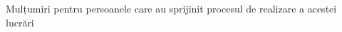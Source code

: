 \pagestyle{empty}
\vspace*{7cm}
\small

{
    \color{gray}
    Mulțumiri pentru persoanele care au sprijinit procesul de realizare a acestei lucrări
}

\normalsize
\newpage